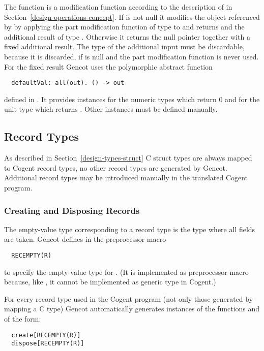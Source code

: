 The function  is a 
modification function according to the description of  in Section~\ref{design-operations-concept}.
If  is not null it modifies the object referenced by  by applying the part modification function  of type 
 to  and returns  and the additional result of type . Otherwise it returns the null pointer 
together with a fixed additional result. The type  of the additional input
must be discardable, because it is discarded, if  is null and the part modification function is never used. 
For the fixed result Gencot uses the polymorphic abstract function
\begin{verbatim}
  defaultVal: all(out). () -> out
\end{verbatim}
defined in . 
It provides instances for the numeric types  which return 0 and for the unit type \code{()} which returns \code{()}. 
Other instances must be defined manually.

\subsection{Record Types}
\label{design-operations-record}

As described in Section~\ref{design-types-struct} C struct types are always mapped to Cogent record types, no other 
record types are generated by Gencot. 
Additional record types may be introduced manually in the translated Cogent program.

\subsubsection{Creating and Disposing Records}

The empty-value type corresponding to a record type  is the type  where all fields are taken.
Gencot defines in  the preprocessor macro 
\begin{verbatim}
  RECEMPTY(R)
\end{verbatim}
to specify the empty-value type for . (It is implemented 
as preprocessor macro because, like , it cannot be implemented as generic type in Cogent.)

For every record type  used in the Cogent program (not only those generated by mapping a C type) Gencot automatically
generates instances of the functions  and  of the form:
\begin{verbatim}
  create[RECEMPTY(R)]
  dispose[RECEMPTY(R)]
\end{verbatim}

